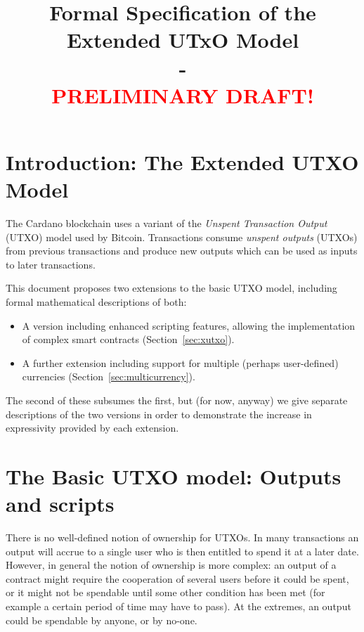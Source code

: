 \documentclass[a4paper]{article}
\newcommand{\red}[1]{\textcolor{red}{#1}}
\theoremstyle{definition}  %
\begin{document}
\title{Formal Specification of the Extended UTxO Model\\- \\
  \red{\textsf{PRELIMINARY DRAFT!}}}
\maketitle

\thispagestyle{plain}
\pagestyle{plain}



\section{Introduction: The Extended UTXO Model}
\label{sec:intro}
The Cardano blockchain uses a variant of the \textit{Unspent
  Transaction Output} (UTXO) model used by Bitcoin.  Transactions
consume \textit{unspent outputs} (UTXOs) from previous transactions and
produce new outputs which can be used as inputs to later transactions.

This document proposes two extensions to the basic UTXO model, including
formal mathematical descriptions of both:
\begin{itemize}
\item A version including enhanced scripting features, allowing the
  implementation of complex smart contracts (Section~\ref{sec:xutxo}).
\item A further extension including support for multiple (perhaps user-defined)
  currencies (Section~\ref{sec:multicurrency}).
\end{itemize}

\noindent The second of these subsumes the first, but (for now, anyway) we give
separate descriptions of the two versions in order to demonstrate the
increase in expressivity provided by each extension.

\section{The Basic UTXO model: Outputs and scripts}
\label{sec:utxo-intro}
There is no well-defined notion of ownership for UTXOs.  In many
transactions an output will accrue to a single user who is then
entitled to spend it at a later date.  However, in general the notion
of ownership is more complex: an output of a contract might require
the cooperation of several users before it could be spent, or it might
not be spendable until some other condition has been met (for example
a certain period of time may have to pass).  At the extremes, an
output could be spendable by anyone, or by no-one.
\end{document}

